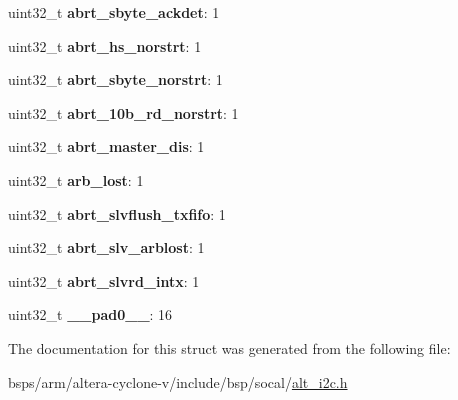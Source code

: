 \begin{DoxyCompactItemize}
uint32\+\_\+t {\bfseries abrt\+\_\+sbyte\+\_\+ackdet}\+: 1
\item 
\mbox{\label{structALT__I2C__TX__ABRT__SRC__s_aa0071fea37b1ed5833e060c1b7afd07c}} 
uint32\+\_\+t {\bfseries abrt\+\_\+hs\+\_\+norstrt}\+: 1
\item 
\mbox{\label{structALT__I2C__TX__ABRT__SRC__s_a799fc1922b200e21851f4922bdad958c}} 
uint32\+\_\+t {\bfseries abrt\+\_\+sbyte\+\_\+norstrt}\+: 1
\item 
\mbox{\label{structALT__I2C__TX__ABRT__SRC__s_a0e5c5a8798036060e6fe476043753e41}} 
uint32\+\_\+t {\bfseries abrt\+\_\+10b\+\_\+rd\+\_\+norstrt}\+: 1
\item 
\mbox{\label{structALT__I2C__TX__ABRT__SRC__s_a8b4bea634492dda74ce61372e606313e}} 
uint32\+\_\+t {\bfseries abrt\+\_\+master\+\_\+dis}\+: 1
\item 
\mbox{\label{structALT__I2C__TX__ABRT__SRC__s_ac50ab507a02c50da0b3a2955f327b3b7}} 
uint32\+\_\+t {\bfseries arb\+\_\+lost}\+: 1
\item 
\mbox{\label{structALT__I2C__TX__ABRT__SRC__s_a428e868db9199ad8fa0c72e4a150aa55}} 
uint32\+\_\+t {\bfseries abrt\+\_\+slvflush\+\_\+txfifo}\+: 1
\item 
\mbox{\label{structALT__I2C__TX__ABRT__SRC__s_a8d2c724e2d1da9f68010b5f2a9ebd066}} 
uint32\+\_\+t {\bfseries abrt\+\_\+slv\+\_\+arblost}\+: 1
\item 
\mbox{\label{structALT__I2C__TX__ABRT__SRC__s_a2e8a3176a5af61d8c2b67f2444874981}} 
uint32\+\_\+t {\bfseries abrt\+\_\+slvrd\+\_\+intx}\+: 1
\item 
\mbox{\label{structALT__I2C__TX__ABRT__SRC__s_aff470f1dbaaae6ad9560e56057839762}} 
uint32\+\_\+t {\bfseries \+\_\+\+\_\+pad0\+\_\+\+\_\+}\+: 16
\end{DoxyCompactItemize}


The documentation for this struct was generated from the following file\+:\begin{DoxyCompactItemize}
\item 
bsps/arm/altera-\/cyclone-\/v/include/bsp/socal/\mbox{\hyperlink{socal_2alt__i2c_8h}{alt\+\_\+i2c.\+h}}\end{DoxyCompactItemize}
